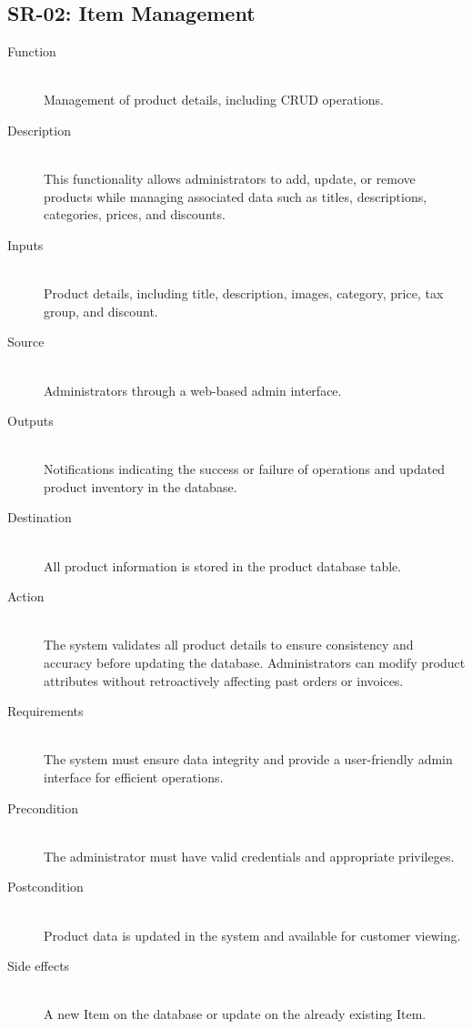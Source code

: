 \documentclass[a4paper,journal]{IEEEtran}
\begin{document}
\subsection{SR-02: Item Management}
\begin{description}
  \item[Function] \hfill \\
  Management of
  product details, including CRUD operations.
  \item[Description] \hfill \\
  This functionality allows administrators to add,
  update, or remove products while managing associated data such as titles,
  descriptions, categories, prices, and discounts.
  \item[Inputs] \hfill \\
  Product
  details, including title, description, images, category, price, tax group, and
  discount.
  \item[Source] \hfill \\
  Administrators through a web-based admin interface.
  \item[Outputs] \hfill \\
  Notifications indicating the success or failure of
  operations and updated product inventory in the database.
  \item[Destination] \hfill \\
  All product information is stored in the product
  database table.
  \item[Action] \hfill \\
  The system validates all product details to ensure
  consistency and accuracy before updating the database. Administrators can
  modify product attributes without retroactively affecting past orders or
  invoices.
  \item[Requirements] \hfill \\
  The system must ensure data integrity and provide a
  user-friendly admin interface for efficient operations.
  \item[Precondition] \hfill \\
  The administrator must have valid credentials and
  appropriate privileges.
  \item[Postcondition] \hfill \\
  Product data is updated in the system and available
  for customer viewing.
  \item[Side effects] \hfill \\
  A new Item on the database or update on the already
  existing Item.
\end{description}
\end{document}
